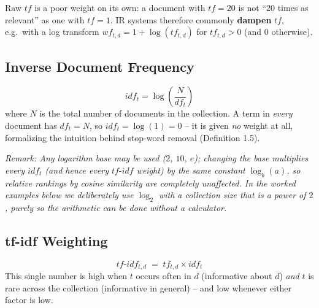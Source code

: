 \documentclass[11pt, a4paper]{article}
\newcommand{\Note}[1]{\par\noindent\textit{\color{darkgray}Remark: #1}\par}
\begin{document}
Raw $tf$ is a poor weight on its own: a document with $tf=20$ is not ``20 times as relevant'' as one with $tf=1$. IR systems therefore commonly \textbf{dampen} $tf$, e.g.\ with a log transform $wf_{t,d} = 1+\log(tf_{t,d})$ for $tf_{t,d}>0$ (and $0$ otherwise).

\subsection{Inverse Document Frequency}

\begin{formulabox}
\[
idf_t = \log\!\left(\frac{N}{df_t}\right)
\]
where $N$ is the total number of documents in the collection. A term in \emph{every} document has $df_t=N$, so $idf_t = \log(1) = 0$ -- it is given \emph{no} weight at all, formalizing the intuition behind stop-word removal (Definition 1.5).
\end{formulabox}

\Note{Any logarithm base may be used ($2$, $10$, $e$); changing the base multiplies every $idf_t$ (and hence every $tf\text{-}idf$ weight) by the same constant $\log_b(a)$, so relative rankings by cosine similarity are completely unaffected. In the worked examples below we deliberately use $\log_2$ with a collection size that is a power of $2$, purely so the arithmetic can be done without a calculator.}

\subsection{tf-idf Weighting}
\label{sec:vsm-tfidf}

\begin{formulabox}
\[
tf\text{-}idf_{t,d} \;=\; tf_{t,d} \times idf_t
\]
This single number is high when $t$ occurs often in $d$ (informative about $d$) \emph{and} $t$ is rare across the collection (informative in general) -- and low whenever either factor is low.
\end{formulabox}
\end{document}
